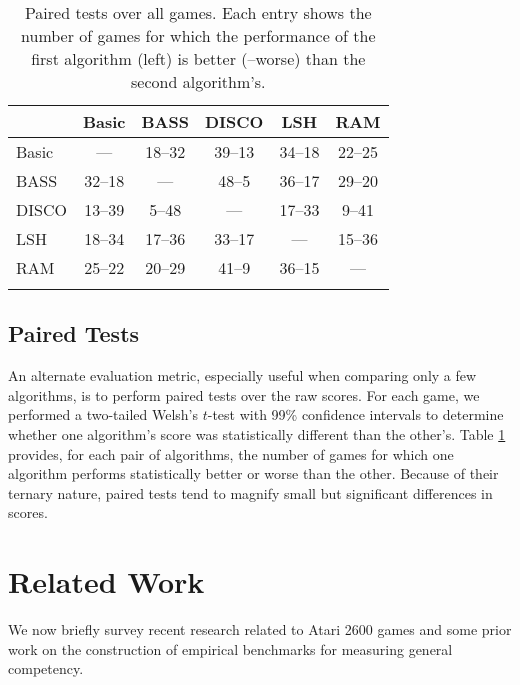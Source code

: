 \documentclass[twoside,11pt]{article}
\begin{document}
\begin{table}
\begin{center}
\addtolength{\tabcolsep}{-0.8pt}
\small{
\begin{tabular}{@{}lccccc@{}}
\toprule
& Basic & BASS & DISCO & LSH & RAM \\
\midrule
Basic & --- & 18--32 & 39--13 & 34--18 & 22--25 \\ 
\hline
BASS & 32--18 & --- & 48--5 & 36--17 & 29--20 \\ 
\hline
DISCO & 13--39 & 5--48 & --- & 17--33 & 9--41 \\ 
\hline
LSH & 18--34 & 17--36 & 33--17 & --- & 15--36 \\ 
\hline
RAM & 25--22 & 20--29 & 41--9 & 36--15 & --- \\ 
\bottomrule
\vspace{-1.6em}
\end{tabular}
}
\caption{Paired tests over all games. Each entry shows the number of games for which the performance of the first algorithm (left) is better (--worse) than the second algorithm's.\label{table:paired_tests}}
\end{center}
\vspace{-2em}
\end{table}

\subsection{Paired Tests}

An alternate evaluation metric, especially useful when comparing only a few algorithms, is to perform paired tests over the raw scores. For each game, we performed a two-tailed Welsh's $t$-test with 99\% confidence intervals to determine whether one algorithm's score was statistically different than the other's. Table \ref{table:paired_tests} provides, for each pair of algorithms, the number of games for which one algorithm performs statistically better or worse than the other. Because of their ternary nature, paired tests tend to magnify small but significant differences in scores. 

\section{Related Work}
\label{sec:relatedwork}

We now briefly survey recent research related to Atari 2600 games and some prior work on the construction of empirical benchmarks for measuring general competency.
\end{document}
